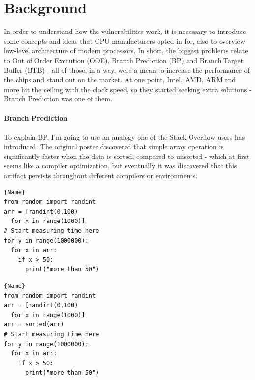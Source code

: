 \documentclass{article}
\begin{document}
\section{Background}

In order to understand how the vulnerabilities work, it is necessary to introduce some concepts and ideas that CPU manufacturers opted in for, also to overview low-level architecture of modern processors. In short, the biggest problems relate to Out of Order Execution (OOE), Branch Prediction (BP) and Branch Target Buffer (BTB) - all of those, in a way, were a mean to increase the performance of the chips and stand out on the market. At one point, Intel, AMD, ARM and more hit the ceiling with the clock speed, so they started seeking extra solutions - Branch Prediction was one of them. 

\paragraph{Branch Prediction}
To explain BP, I'm going to use an analogy one of the Stack Overflow users has introduced\cite{BranchpredictionSO}. The original poster discovered that simple array operation is significantly faster when the data is sorted, compared to unsorted - which at first seems like a compiler optimization, but eventually it was discovered that this artifact persists throughout different compilers or environments. 

\noindent\begin{minipage}{.45\textwidth}
\begin{lstlisting}[caption=Operation on an unsorted array,frame=tlrb]{Name}
from random import randint
arr = [randint(0,100) 
  for x in range(1000)]
# Start measuring time here
for y in range(1000000):
  for x in arr:
    if x > 50:
      print("more than 50")
\end{lstlisting}
\end{minipage}\hfill
\begin{minipage}{.45\textwidth}
\begin{lstlisting}[caption=Operation on a sorted array,frame=tlrb]{Name}
from random import randint
arr = [randint(0,100) 
  for x in range(1000)]
arr = sorted(arr)
# Start measuring time here
for y in range(1000000):
  for x in arr:
    if x > 50:
      print("more than 50")
\end{lstlisting}
\end{minipage}
\end{document}
